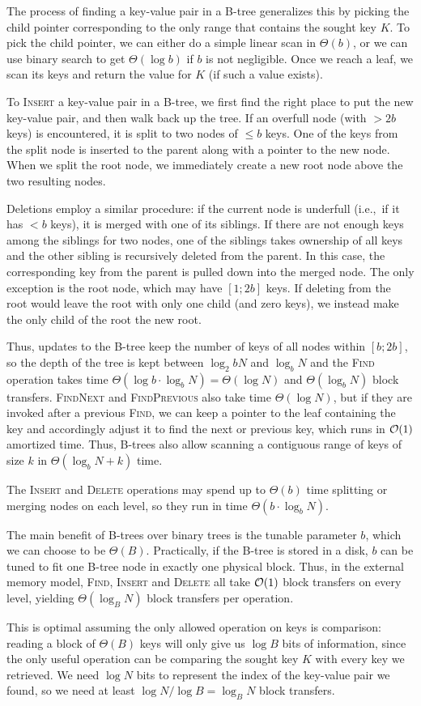 The process of finding a key-value pair in a B-tree generalizes this
by picking the child pointer corresponding to the only range that contains
the sought key $K$. To pick the child pointer, we can either do a simple
linear scan in $\Theta(b)$, or we can use binary search to get
$\Theta(\log b)$ if $b$ is not negligible.
Once we reach a leaf, we scan its keys and return the value for $K$
(if such a value exists).

To \textsc{Insert} a key-value pair in a B-tree, we first find the right
place to put the new key-value pair, and then walk back up the tree.
If an overfull node (with $> 2b$ keys) is encountered, it is split
to two nodes of $\leq b$ keys. One of the keys from the split node
is inserted to the parent along with a pointer to the new node.
When we split the root node, we immediately create a new root node above the
two resulting nodes.

Deletions employ a similar procedure: if the current node is underfull
(i.e.,\ if it has $< b$ keys), it is merged with one of its siblings.
If there are not enough keys among the siblings for two nodes,
one of the siblings takes ownership of all keys and the other sibling
is recursively deleted from the parent. In this case, the corresponding
key from the parent is pulled down into the merged node.
The only exception is the root node, which may have $[1;2b]$ keys.
If deleting from the root would leave the root with only one child
(and zero keys), we instead make the only child of the root the new root.

Thus, updates to the B-tree keep the number of keys of all nodes within
$[b;2b]$, so the depth of the tree is kept between $\log_2b N$ and $\log_b N$
and the \textsc{Find} operation takes time
$\Theta(\log b \cdot \log_b N)=\Theta(\log N)$ and $\Theta(\log_b N)$
block transfers. \textsc{FindNext} and \textsc{FindPrevious} also take time
$\Theta(\log N)$, but if they are invoked after a previous \textsc{Find}, we
can keep a pointer to the leaf containing the key and accordingly adjust it to
find the next or previous key, which runs in $\mathcal{O}(1)$ amortized time. Thus,
B-trees also allow scanning a contiguous range of keys of size $k$ in
$\Theta(\log_b N + k)$ time.

The \textsc{Insert} and \textsc{Delete} operations may spend up to
$\Theta(b)$ time splitting or merging nodes on each level, so they run in
time $\Theta(b \cdot \log_b N)$.

The main benefit of B-trees over binary trees is the tunable parameter
$b$, which we can choose to be $\Theta(B)$. Practically, if the B-tree
is stored in a disk, $b$ can be tuned to fit one B-tree node in exactly one
physical block. Thus, in the external memory model, \textsc{Find},
\textsc{Insert} and \textsc{Delete} all take $\mathcal{O}(1)$ block transfers
on every level, yielding $\Theta(\log_B N)$ block transfers per operation.

This is optimal assuming the only allowed operation
on keys is comparison: reading a block of $\Theta(B)$ keys will only
give us $\log B$ bits of information, since the only useful operation
can be comparing the sought key $K$ with every key we retrieved.
We need $\log N$ bits to represent the index of the key-value pair we found,
so we need at least $\log N/\log B=\log_B N$ block transfers.
